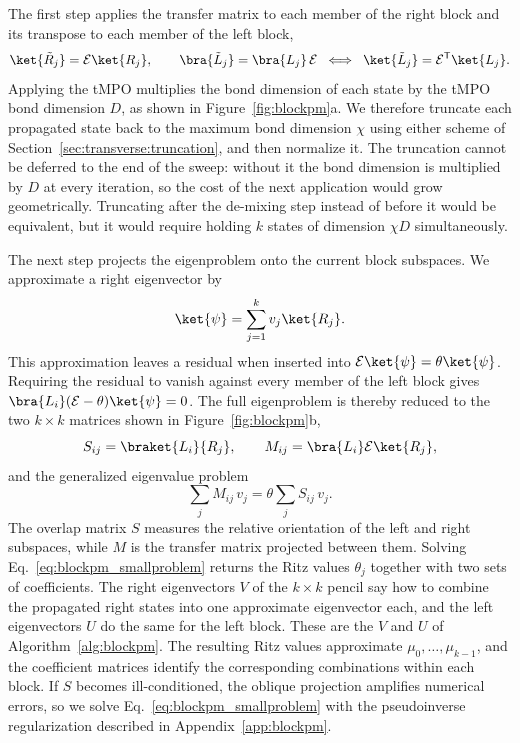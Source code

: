 The first step applies the transfer matrix to each member of the right block and its transpose to each member of the left block,
\begin{equation}
  \ket{\tilde R_j} = \mathcal{E}\ket{R_j},
  \qquad
  \bra{\tilde L_j} = \bra{L_j}\,\mathcal{E}
  \;\;\Longleftrightarrow\;\;
  \ket{\tilde L_j} = \mathcal{E}^{\mathsf T}\ket{L_j}.
  \label{eq:blockpm_apply}
\end{equation}
Applying the \ac{tMPO} multiplies the bond dimension of each state by the \ac{tMPO} bond dimension $D$, as shown in Figure~\ref{fig:blockpm}a. We therefore truncate each propagated state back to the maximum bond dimension $\chi$ using either scheme of Section~\ref{sec:transverse:truncation}, and then normalize it. The truncation cannot be deferred to the end of the sweep: without it the bond dimension is multiplied by $D$ at every iteration, so the cost of the next application would grow geometrically. Truncating after the de-mixing step instead of before it would be equivalent, but it would require holding $k$ states of dimension $\chi D$ simultaneously.

The next step projects the eigenproblem onto the current block subspaces. We approximate a right eigenvector by
\begin{equation}
  \ket{\psi} = \sum_{j=1}^{k} v_j \ket{R_j}.
  \label{eq:blockpm_ansatz}
\end{equation}
This approximation leaves a residual when inserted into $\mathcal{E}\ket{\psi}=\theta\ket{\psi}$. Requiring the residual to vanish against every member of the left block gives $\bra{L_i}(\mathcal{E}-\theta)\ket{\psi}=0$. The full eigenproblem is thereby reduced to the two $k\times k$ matrices shown in Figure~\ref{fig:blockpm}b,
\begin{equation}
  S_{ij}=\braket{L_i}{R_j},
  \qquad
  M_{ij}=\bra{L_i}\mathcal{E}\ket{R_j},
  \label{eq:blockpm_pencil}
\end{equation}
and the generalized eigenvalue problem
\begin{equation}
  \sum_{j} M_{ij}\,v_j = \theta \sum_{j} S_{ij}\,v_j .
  \label{eq:blockpm_smallproblem}
\end{equation}
The overlap matrix $S$ measures the relative orientation of the left and right subspaces, while $M$ is the transfer matrix projected between them. Solving Eq.~\eqref{eq:blockpm_smallproblem} returns the Ritz values $\theta_j$ together with two sets of coefficients. The right eigenvectors $V$ of the $k\times k$ pencil say how to combine the propagated right states into one approximate eigenvector each, and the left eigenvectors $U$ do the same for the left block. These are the $V$ and $U$ of Algorithm~\ref{alg:blockpm}. The resulting Ritz values approximate $\mu_0,\dots,\mu_{k-1}$, and the coefficient matrices identify the corresponding combinations within each block. If $S$ becomes ill-conditioned, the oblique projection amplifies numerical errors, so we solve Eq.~\eqref{eq:blockpm_smallproblem} with the pseudoinverse regularization described in Appendix~\ref{app:blockpm}.

